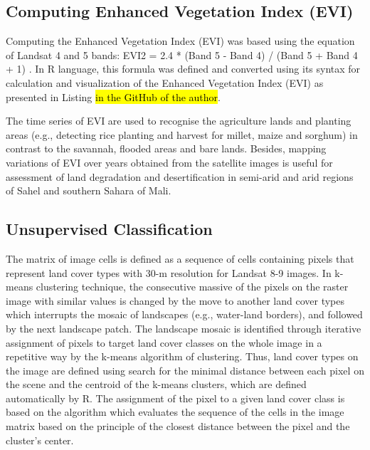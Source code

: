 \documentclass[12pt,a4paper,oneside]{article}
\def \newpar{\vspace{6pt}}
\begin{document}
\subsection*{Computing Enhanced Vegetation Index (EVI)}

\newpar Computing the Enhanced Vegetation Index (EVI) was based using the equation of Landsat 4 and 5 bands: EVI2 = 2.4 * (Band 5 - Band 4) / (Band 5 + Band 4 + 1) \citep{HUETE2002195}. In R language, this formula was defined and converted using its syntax for calculation and visualization of the Enhanced Vegetation Index (EVI) as presented in Listing \hl{in the GitHub of the author}.

\newpar The time series of EVI are used to recognise the agriculture lands and planting areas (e.g., detecting rice planting and harvest for millet, maize and sorghum) in contrast to the savannah, flooded areas and bare lands. Besides, mapping variations of EVI over years obtained from the satellite images is useful for assessment of land degradation and desertification in semi-arid and arid regions of Sahel and southern Sahara of Mali. 

\subsection*{Unsupervised Classification}

\newpar The matrix of image cells is defined as a sequence of cells containing pixels that represent land cover types with 30-m resolution for Landsat 8-9 images. In k-means clustering technique, the consecutive massive of the pixels on the raster image with similar values is changed by the move to another land cover types which interrupts the mosaic of landscapes (e.g., water-land borders), and followed by the next landscape patch. The landscape mosaic is identified through iterative assignment of pixels to target land cover classes  on the whole image in a repetitive way by the k-means algorithm of clustering. Thus, land cover types on the image are defined using search for the minimal distance between each pixel on the scene and the centroid of the k-means clusters, which are defined automatically by R. The assignment of the pixel to a given land cover class is based on the algorithm which evaluates the sequence of the cells in the image matrix based on the principle of the closest distance between the pixel and the cluster's center.
\end{document}
